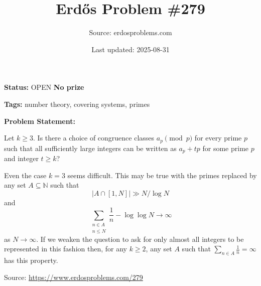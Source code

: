 \documentclass{article}
\title{Erd\H{o}s Problem \#279}
\date{Last updated: 2025-08-31}
\author{Source: erdosproblems.com}
\begin{document}
\maketitle

\noindent\textbf{Status:} OPEN \quad \textbf{No prize}

\noindent\textbf{Tags:} number theory, covering systems, primes

\medskip

\noindent\textbf{Problem Statement:}

Let $k\geq 3$. Is there a choice of congruence classes $a_p\pmod{p}$ for every prime $p$ such that all sufficiently large integers can be written as $a_p+tp$ for some prime $p$ and integer $t\geq k$?




Even the case $k=3$ seems difficult. This may be true with the primes replaced by any set $A\subseteq \mathbb{N}$ such that\[\lvert A\cap [1,N]\rvert \gg N/\log N\]and\[\sum_{\substack{n\in A\\ n\leq N}}\frac{1}{n} -\log\log N\to \infty\]as $N\to \infty$. If we weaken the question to ask for only almost all integers to be represented in this fashion then, for any $k\geq 2$, any set $A$ such that $\sum_{n\in A}\frac{1}{n}=\infty$ has this property.


\bigskip
\noindent\small{Source: \url{https://www.erdosproblems.com/279}}
\end{document}
